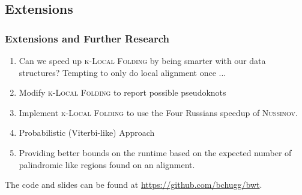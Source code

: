 \documentclass{beamer}
\newcommand{\klf}{\textsc{k-Local Folding}\xspace}
\newcommand{\rf}{\textsc{Nussinov}\xspace}
\begin{document}
\begin{frame}
\section{Extensions}
\frametitle{Extensions and Further Research}
\begin{enumerate}
\item Can we speed up \klf by being smarter with our data structures? Tempting to only do local alignment once ... 
\item Modify \klf to report possible pseudoknots 
\item Implement \klf to use the Four Russians speedup of \rf. 
\item  Probabilistic (Viterbi-like) Approach
\item Providing better bounds on the runtime based on the expected number of palindromic like regions found on an alignment. 
\end{enumerate}
\end{frame}

\begin{frame}
The code and slides can be found at \url{https://github.com/bchugg/bwt}. 
\end{frame}
\end{document}
